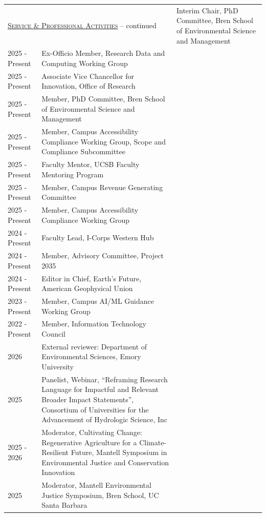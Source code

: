 
\begin{longtable}{l p{5.5in}}

\endfirsthead
\multicolumn{2}{l}{\hspace{.1in} \textsc{\underline{Service \& Professional Activities}} -- continued
\vspace*{.1in} }  \endhead

2025 - Present & Interim Chair, PhD Committee, Bren School of Environmental Science and Management \\
2025 - Present & Ex-Officio Member, Research Data and Computing Working Group \\
2025 - Present & Associate Vice Chancellor for Innovation, Office of Research \\
2025 - Present & Member, PhD Committee, Bren School of Environmental Science and Management \\
2025 - Present & Member, Campus Accessibility Compliance Working Group, Scope and Compliance Subcommittee \\
2025 - Present & Faculty Mentor, UCSB Faculty Mentoring Program \\
2025 - Present & Member, Campus Revenue Generating Committee \\
2025 - Present & Member, Campus Accessibility Compliance Working Group \\
2024 - Present & Faculty Lead, I-Corps Western Hub \\
2024 - Present & Member, Advisory Committee, Project 2035 \\
2024 - Present & Editor in Chief, Earth's Future, American Geophysical Union \\
2023 - Present & Member, Campus AI/ML Guidance Working Group \\
2022 - Present & Member, Information Technology Council \\
2026 & External reviewer: Department of Environmental Sciences, Emory University \\
2025 & Panelist, Webinar, ``Reframing Research Language for Impactful and Relevant Broader Impact Statements'', Consortium of Universities for the Advancement of Hydrologic Science, Inc \\
2025 - 2026 & Moderator, Cultivating Change: Regenerative Agriculture for a Climate-Resilient Future, Mantell Symposium in Environmental Justice and Conservation Innovation \\
2025 & Moderator, Mantell Environmental Justice Symposium, Bren School, UC Santa Barbara \\

\end{longtable}
